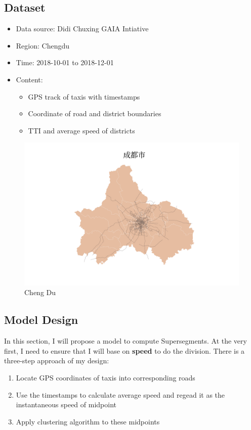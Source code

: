 \documentclass[fontset=none]{ctexart}
\theoremstyle{definition}
\theoremstyle{remark}
\begin{document}
\subsection{Dataset}
\begin{itemize}
    \item Data source: Didi Chuxing GAIA Intiative
    \item Region: Chengdu
    \item Time: 2018-10-01 to 2018-12-01
    \item Content:
        \begin{itemize}
            \item GPS track of taxis with timestamps
            \item Coordinate of road and district boundaries
            \item TTI and average speed of districts
        \end{itemize}
\end{itemize}
\begin{figure}[htb]
  \centering
  \includegraphics[width=\textwidth]{images/成都市.png}
  \caption{Cheng Du}
  \label{fig: chengdu}
\end{figure}

\subsection{Model Design}
In this section, I will propose a model to compute Supersegments.
At the very first, I need to ensure that I will base on \textbf{speed} to do the division.
There is a three-step approach of my design:
\begin{enumerate}
    \item Locate GPS coordinates of taxis into corresponding roads
    \item Use the timestamps to calculate average speed and regead it as the instantaneous speed of midpoint
    \item Apply clustering algorithm to these midpoints
\end{enumerate}
\end{document}
